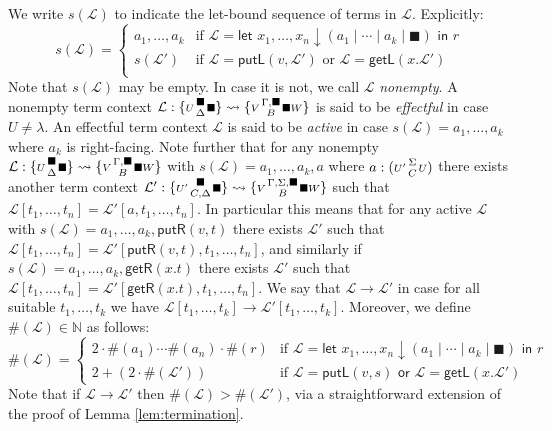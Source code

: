 \documentclass[twoside,11pt,final]{entics}
\newcommand{\getl}{\mathsf{getL}}
\newcommand{\putr}{\mathsf{putR}}
\newcommand{\getr}{\mathsf{getR}}
\newcommand{\putl}{\mathsf{putL}}
\newcommand{\cells}[4]{({\scriptstyle #1} {{\scriptstyle #2} \atop {\scriptstyle #3}} {\scriptstyle #4})}
\newcommand{\wiggle}[4]{\{{\scriptstyle #1} {{\scriptstyle #2} \atop {\scriptstyle #3}} {\scriptstyle #4}\}}
\newcommand{\asn}{\downarrow}
\newcommand{\seq}{,\!\ldots\!,}
\begin{document}
We write $s(\mathcal{L})$ to indicate the let-bound sequence of terms in $\mathcal{L}$. Explicitly:
\[
  s(\mathcal{L}) =
  \begin{cases}
    a_1 \seq a_k &\text{if } \mathcal{L} = \textsf{let } x_1 \seq x_n \asn (a_1 \mid \cdots \mid a_k \mid \blacksquare) \textsf{ in } r\\
    s(\mathcal{L}') &\text{if } \mathcal{L} = \putl(v,\mathcal{L}') \text{ or } \mathcal{L} = \getl(x.\mathcal{L}')\\
  \end{cases}
\]
Note that $s(\mathcal{L})$ may be empty. In case it is not, we call $\mathcal{L}$ \emph{nonempty}. A nonempty term context $\mathcal{L} : \wiggle{U}{\blacksquare}{\Delta}{\blacksquare} \rightsquigarrow \wiggle{V}{\Gamma,\blacksquare}{B}{\blacksquare W}$ is said to be \emph{effectful} in case $U \neq \lambda$. An effectful term context $\mathcal{L}$ is said to be \emph{active} in case $s(\mathcal{L}) = a_1 \seq a_k$ where $a_k$ is right-facing. Note further that for any nonempty $\mathcal{L} : \wiggle{U}{\blacksquare}{\Delta}{\blacksquare} \rightsquigarrow \wiggle{V}{\Gamma,\blacksquare}{B}{\blacksquare W}$ with $s(\mathcal{L}) = a_1\seq a_k,a$ where $a : \cells{U'}{\Sigma}{C}{U}$ there exists another term context $\mathcal{L}' : \wiggle{U'}{\blacksquare}{C,\Delta}{\blacksquare} \rightsquigarrow \wiggle{V}{\Gamma,\Sigma,\blacksquare}{B}{\blacksquare W}$ such that $\mathcal{L}[t_1 \seq t_n] = \mathcal{L}'[a,t_1\seq t_n]$. In particular this means that for any active $\mathcal{L}$ with $s(\mathcal{L}) = a_1 \seq a_k,\putr(v,t)$ there exists $\mathcal{L}'$ such that $\mathcal{L}[t_1\seq t_n] = \mathcal{L}'[\putr(v,t),t_1\seq t_n]$, and similarly if $s(\mathcal{L}) = a_1\seq a_k ,\getr(x.t)$ there exists $\mathcal{L}'$ such that $\mathcal{L}[t_1\seq t_n] = \mathcal{L}'[\getr(x.t),t_1 \seq t_n]$. We say that $\mathcal{L} \to \mathcal{L}'$ in case for all suitable $t_1,\ldots,t_k$ we have $\mathcal{L}[t_1 \seq t_k] \to \mathcal{L}'[t_1 \seq t_k]$. Moreover, we define $\#(\mathcal{L}) \in \mathbb{N}$ as follows:
\[
  \#(\mathcal{L}) = \begin{cases}
		2 \cdot\#(a_1) \cdots \#(a_n) \cdot \#(r) & \text{if } \mathcal{L} = \textsf{let } x_1 \seq x_n \asn (a_1 \mid \cdots \mid a_k \mid \blacksquare) \textsf{ in } r\\
		2 + (2 \cdot \#(\mathcal{L}')) & \text{if } \mathcal{L} = \putl(v,s) \textsf{ or } \mathcal{L} = \getl(x.\mathcal{L}')
	\end{cases}
\]
Note that if $\mathcal{L} \to \mathcal{L}'$ then $\#(\mathcal{L}) > \#(\mathcal{L}')$, via a straightforward extension of the proof of Lemma \ref{lem:termination}.
\end{document}
